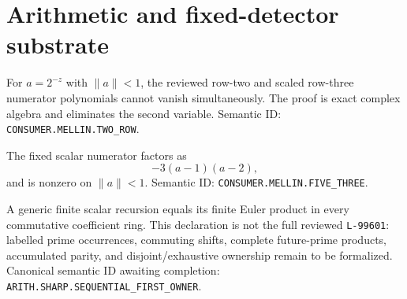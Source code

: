 
\section{Arithmetic and fixed-detector substrate}

\begin{theorem}
\label{thm:B-rows23-exact}
For \(a=2^{-z}\) with \(\lVert a\rVert<1\), the reviewed row-two and
scaled row-three numerator polynomials cannot vanish simultaneously.
The proof is exact complex algebra and eliminates the second variable.
Semantic ID: \texttt{CONSUMER.MELLIN.TWO\_ROW}.
\end{theorem}

\begin{theorem}
\label{thm:B-five-three-exact}
The fixed scalar numerator factors as
\[
 -3(a-1)(a-2),
\]
and is nonzero on \(\lVert a\rVert<1\).
Semantic ID: \texttt{CONSUMER.MELLIN.FIVE\_THREE}.
\end{theorem}

\begin{theorem}
\label{thm:B-first-owner-scalar}
A generic finite scalar recursion equals its finite Euler product in every
commutative coefficient ring.
\notready
This declaration is not the full reviewed \texttt{L-99601}: labelled prime
occurrences, commuting shifts, complete future-prime products, accumulated
parity, and disjoint/exhaustive ownership remain to be formalized.
Canonical semantic ID awaiting completion:
\texttt{ARITH.SHARP.SEQUENTIAL\_FIRST\_OWNER}.
\end{theorem}

